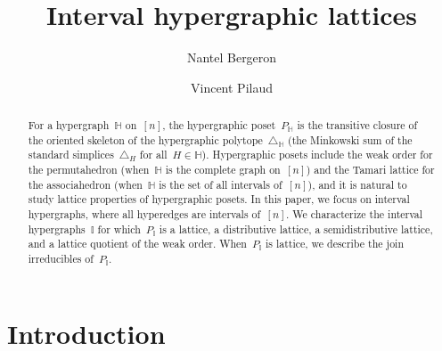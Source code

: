 \documentclass[reqno]{amsart}
\title{Interval hypergraphic lattices}
\author[N.~Bergeron]{Nantel Bergeron}
\author{Vincent Pilaud}
\theoremstyle{definition}
\newcommand{\simplex}{\triangle} %
\newcommand{\HH}{\mathbb H}  %
\newcommand{\II}{\mathbb I} %
\begin{document}
\begin{abstract}
For a hypergraph~$\HH$ on~$[n]$, the hypergraphic poset~$P_\HH$ is the transitive closure of the oriented skeleton of the hypergraphic polytope~$\simplex_\HH$ (the Minkowski sum of the standard simplices~$\simplex_H$ for all~$H \in \HH$).
Hypergraphic posets include the weak order for the permutahedron (when~$\HH$ is the complete graph on~$[n]$) and the Tamari lattice for the associahedron (when~$\HH$ is the set of all intervals of~$[n]$), and it is natural to study lattice properties of hypergraphic posets.
In this paper, we focus on interval hypergraphs, where all hyperedges are intervals of~$[n]$.
We characterize the interval hypergraphs~$\II$ for which~$P_\II$ is a lattice, a distributive lattice, a semidistributive lattice, and a lattice quotient of the weak order.
When~$P_\II$ is lattice, we describe the join irreducibles of~$P_\II$.
\end{abstract}

\maketitle

\tableofcontents


\section{Introduction}
\label{sec:introduction}
\end{document}
